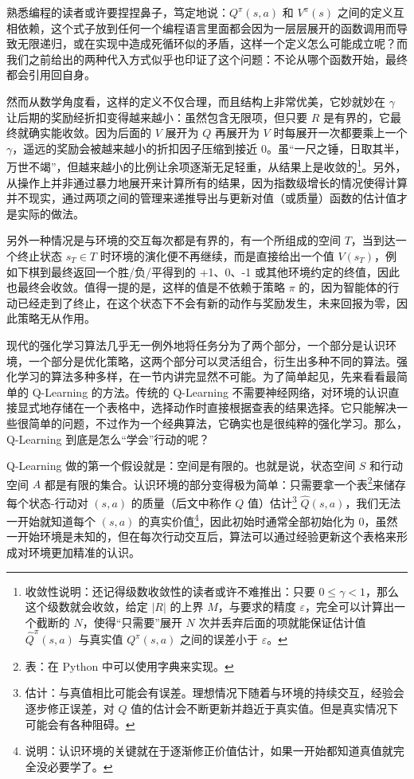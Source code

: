熟悉编程的读者或许要捏捏鼻子，笃定地说：$Q^\pi (s, a)$ 和 $V^\pi (s)$ 之间的定义互相依赖，这个式子放到任何一个编程语言里面都会因为一层层展开的函数调用而导致无限递归，或在实现中造成死循环似的矛盾，这样一个定义怎么可能成立呢？而我们之前给出的两种代入方式似乎也印证了这个问题：不论从哪个函数开始，最终都会引用回自身。

然而从数学角度看，这样的定义不仅合理，而且结构上非常优美，它妙就妙在 $\gamma$ 让后期的奖励经折扣变得越来越小：虽然包含无限项，但只要 $R$ 是有界的，它最终就确实能收敛。因为后面的 $V$ 展开为 $Q$ 再展开为 $V$ 时每展开一次都要乘上一个 $\gamma$，遥远的奖励会被越来越小的折扣因子压缩到接近 $0$。虽“一尺之锤，日取其半，万世不竭”，但越来越小的比例让余项逐渐无足轻重，从结果上是收敛的\footnote{收敛性说明：还记得级数收敛性的读者或许不难推出：只要 $0 \le \gamma < 1$，那么这个级数就会收敛，给定 $|R|$ 的上界 $M$，与要求的精度 $\varepsilon$，完全可以计算出一个截断的 $N$，使得“只需要”展开 $N$ 次并丢弃后面的项就能保证估计值 $\hat Q^\pi (s, a)$ 与真实值 $Q^\pi (s, a)$ 之间的误差小于 $\varepsilon$。}。另外，从操作上并非通过暴力地展开来计算所有的结果，因为指数级增长的情况使得计算并不现实，通过两项之间的管理来递推导出与更新对值（或质量）函数的估计值才是实际的做法。

另外一种情况是与环境的交互每次都是有界的，有一个所组成的空间 $T$，当到达一个终止状态 $s_T \in T$ 时环境的演化便不再继续，而是直接给出一个值 $V(s_T)$，例如下棋到最终返回一个胜/负/平得到的 +1、0、-1 或其他环境约定的终值，因此也最终会收敛。值得一提的是，这样的值是不依赖于策略 $\pi$ 的，因为智能体的行动已经走到了终止，在这个状态下不会有新的动作与奖励发生，未来回报为零，因此策略无从作用。

现代的强化学习算法几乎无一例外地将任务分为了两个部分，一个部分是认识环境，一个部分是优化策略，这两个部分可以灵活组合，衍生出多种不同的算法。强化学习的算法多种多样，在一节内讲完显然不可能。为了简单起见，先来看看最简单的 Q-Learning 的方法。传统的 Q-Learning 不需要神经网络，对环境的认识直接显式地存储在一个表格中，选择动作时直接根据查表的结果选择。它只能解决一些很简单的问题，不过作为一个经典算法，它确实也是很纯粹的强化学习。那么，Q-Learning 到底是怎么“学会”行动的呢？

Q-Learning 做的第一个假设就是：空间是有限的。也就是说，状态空间 $S$ 和行动空间 $A$ 都是有限的集合。认识环境的部分变得极为简单：只需要拿一个表\footnote{表：在 Python 中可以使用字典来实现。}来储存每个状态-行动对 $(s, a)$ 的质量（后文中称作 $Q$ 值）估计\footnote{估计：与真值相比可能会有误差。理想情况下随着与环境的持续交互，经验会逐步修正误差，对 $Q$ 值的估计会不断更新并趋近于真实值。但是真实情况下可能会有各种阻碍。} $\hat Q(s, a)$，我们无法一开始就知道每个 $(s, a)$ 的真实价值\footnote{说明：认识环境的关键就在于逐渐修正价值估计，如果一开始都知道真值就完全没必要学了。}，因此初始时通常全部初始化为 0，虽然一开始环境是未知的，但在每次行动交互后，算法可以通过经验更新这个表格来形成对环境更加精准的认识。

